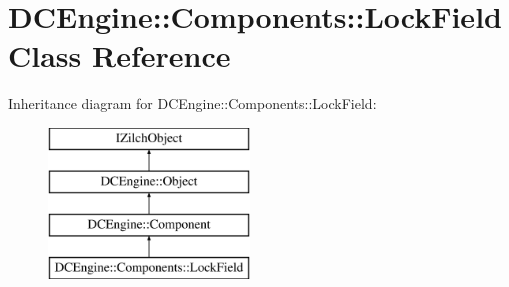 \hypertarget{classDCEngine_1_1Components_1_1LockField}{\section{D\-C\-Engine\-:\-:Components\-:\-:Lock\-Field Class Reference}
\label{classDCEngine_1_1Components_1_1LockField}
}
Inheritance diagram for D\-C\-Engine\-:\-:Components\-:\-:Lock\-Field\-:\begin{figure}[H]
\begin{center}
\leavevmode
\includegraphics[height=4.000000cm]{classDCEngine_1_1Components_1_1LockField}
\end{center}
\end{figure}

